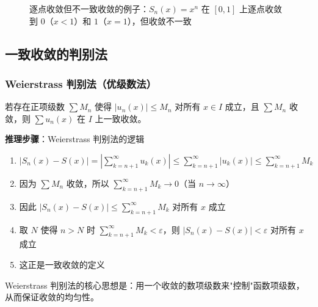 \begin{figure}[htbp]
\centering
{}
\caption{逐点收敛但不一致收敛的例子：$S_n(x)=x^n$ 在 $[0,1]$ 上逐点收敛到 $0$（$x<1$）和 $1$（$x=1$），但收敛不一致}
\end{figure}

\subsection{一致收敛的判别法}

\subsubsection{Weierstrass 判别法（优级数法）}

若存在正项级数 $\sum M_n$ 使得 $|u_n(x)| \leq M_n$ 对所有 $x\in I$ 成立，且 $\sum M_n$ 收敛，则 $\sum u_n(x)$ 在 $I$ 上一致收敛。

\begin{insightbox}
\textbf{推理步骤}：Weierstrass 判别法的逻辑
\begin{enumerate}[leftmargin=2em]
    \item $|S_n(x)-S(x)| = |\sum_{k=n+1}^\infty u_k(x)| \leq \sum_{k=n+1}^\infty |u_k(x)| \leq \sum_{k=n+1}^\infty M_k$
    \item 因为 $\sum M_n$ 收敛，所以 $\sum_{k=n+1}^\infty M_k \to 0$（当 $n\to\infty$）
    \item 因此 $|S_n(x)-S(x)| \leq \sum_{k=n+1}^\infty M_k$ 对所有 $x$ 成立
    \item 取 $N$ 使得 $n>N$ 时 $\sum_{k=n+1}^\infty M_k < \varepsilon$，则 $|S_n(x)-S(x)|<\varepsilon$ 对所有 $x$ 成立
    \item 这正是一致收敛的定义
\end{enumerate}
Weierstrass 判别法的核心思想是：用一个收敛的数项级数来"控制"函数项级数，从而保证收敛的均匀性。
\end{insightbox}

